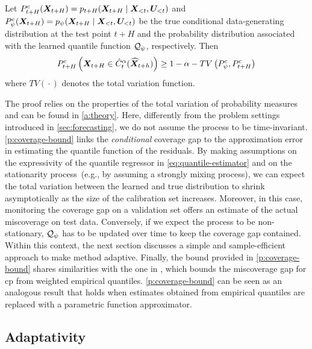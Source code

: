\begin{proposition}\label{p:coverage-bound} Let $P^{c}_{t+H}({\bm{X}}_{t+H}) = p_{t+H}({\bm{X}}_{t+H} \mid {\bm{X}}_{<t}, {\bm{U}}_{<t})$ and $P^c_{\psi}({\bm{X}}_{t+H}) = p_{\psi}({\bm{X}}_{t+H} \mid {\bm{X}}_{<t},{\bm{U}}_{<t})$ be the true conditional data-generating distribution at the test point $t+H$ and the probability distribution associated with the learned quantile function ${\mathcal{Q}}_{\psi}$, respectively. Then
\begin{align*}
    P^c_{t+H}\left(\mX_{t+H} \in \hat C^{\alpha}_t (\widehat \mX_{t+h})\right) \geq 1 - \alpha - {TV}\left(P^c_{\psi}, P^c_{t+H}\right)%
\end{align*}
where ${TV}({}\cdot{})$ denotes the total variation function.
\end{proposition}
The proof relies on the properties of the total variation of probability measures and can be found in \autoref{a:theory}. Here, differently from the problem settings introduced in \autoref{sec:forecasting}, we do not assume the process to be time-invariant. \autoref{p:coverage-bound} links the \textit{conditional} coverage gap to the approximation error in estimating the quantile function of the residuals. By making assumptions on the expressivity of the quantile regressor in \autoref{eq:quantile-estimator} and on the stationarity process~(e.g., by assuming a strongly mixing process), we can expect the total variation between the learned and true distribution to shrink asymptotically as the size of the calibration set increases. Moreover, in this case, monitoring the coverage gap on a validation set offers an estimate of the actual miscoverage on test data. Conversely, if we expect the process to be non-stationary, ${\mathcal{Q}}_\psi$ has to be updated over time to keep the coverage gap contained. Within this context, the next section discusses a simple and sample-efficient approach to make \gls{method} adaptive. Finally, the bound provided in \autoref{p:coverage-bound} shares similarities with the one in \cite{barber2023conformal}, which bounds the miscoverage gap for \gls{cp} from weighted empirical quantiles. \autoref{p:coverage-bound} can be seen as an analogous result that holds when estimates obtained from empirical quantiles are replaced with a parametric function approximator. 


\subsection{Adaptativity}\label{sec:adaptive-inference}

